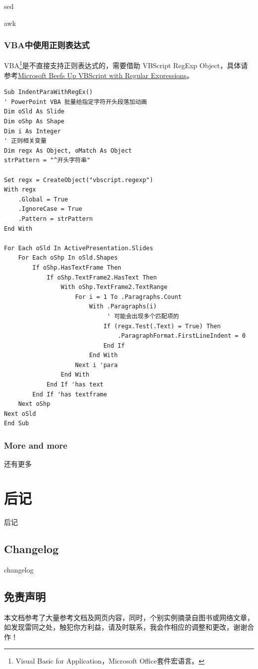 \documentclass[12pt,a4paper,twoside]{ctexart}
\begin{document}
sed \par

awk \par


\subsubsection{VBA中使用正则表达式}
\label{sec:vba}
VBA\footnote{Visual Basic for Application，Microsoft Office套件宏语言。}是不直接支持正则表达式的，需要借助 VBScript RegExp Object，具体请参考\href{http://msdn.microsoft.com/en-us/library/ms974570.aspx}{Microsoft Beefs Up VBScript with Regular Expressions}。
\begin{lstlisting}[language=VBScript]
Sub IndentParaWithRegEx()
' PowerPoint VBA 批量给指定字符开头段落加动画
Dim oSld As Slide
Dim oShp As Shape
Dim i As Integer
' 正则相关变量
Dim regx As Object, oMatch As Object
strPattern = "^开头字符串"

Set regx = CreateObject("vbscript.regexp")
With regx
    .Global = True
    .IgnoreCase = True
    .Pattern = strPattern
End With
    
For Each oSld In ActivePresentation.Slides
    For Each oShp In oSld.Shapes
        If oShp.HasTextFrame Then
            If oShp.TextFrame2.HasText Then
                With oShp.TextFrame2.TextRange
                    For i = 1 To .Paragraphs.Count
                        With .Paragraphs(i)
                             ' 可能会出现多个匹配项的
                            If (regx.Test(.Text) = True) Then
                                .ParagraphFormat.FirstLineIndent = 0
                            End If
                        End With
                    Next i 'para
                End With
            End If 'has text
        End If 'has textframe
    Next oShp
Next oSld
End Sub  
\end{lstlisting}

\subsubsection{More and more}
\label{sec:more}

还有更多

\section{后记}
\label{sec:postscript}

后记 \par

\subsection{Changelog}
\label{sec:changelog}

changelog

\subsection{免责声明}
\label{sec:disclaimer}

本文档参考了大量参考文档及网页内容，同时，个别实例摘录自图书或网络文章，如发现雷同之处，触犯你方利益，请及时联系，我会作相应的调整和更改，谢谢合作！
\end{document}
